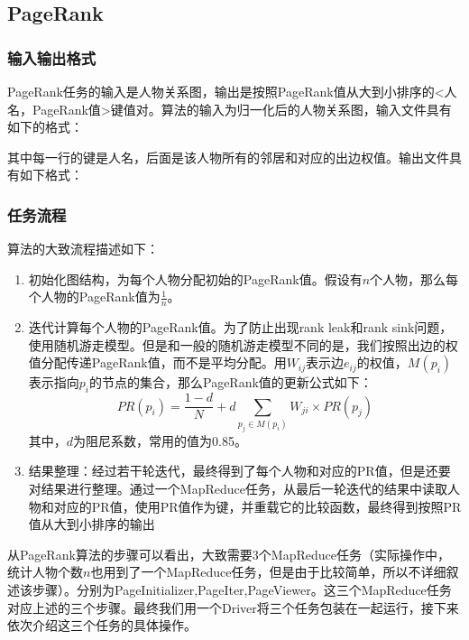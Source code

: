 \newpage

\subsection{PageRank}
\subsubsection{输入输出格式}
PageRank任务的输入是人物关系图，输出是按照PageRank值从大到小排序的<人名，PageRank值>键值对。算法的输入为归一化后的人物关系图，输入文件具有如下的格式：
\begin{center}
\end{center}
其中每一行的键是人名，后面是该人物所有的邻居和对应的出边权值。输出文件具有如下格式：
\begin{center}
\end{center}
\subsubsection{任务流程}
算法的大致流程描述如下：
\begin{enumerate}
	\item 初始化图结构，为每个人物分配初始的PageRank值。假设有$n$个人物，那么每个人物的PageRank值为$\frac{1}{n}$。
	\item 迭代计算每个人物的PageRank值。为了防止出现rank leak和rank sink问题，使用随机游走模型。但是和一般的随机游走模型不同的是，我们按照出边的权值分配传递PageRank值，而不是平均分配。用$W_{ij}$表示边$e_{ij}$的权值，$M(p_i)$表示指向$p_i$的节点的集合，那么PageRank值的更新公式如下：
	\[
		PR(p_i) = \frac{1-d}{N} + d \sum_{p_j \in M(p_i)} W_{ji} \times PR(p_j)
	\]
	其中，$d$为阻尼系数，常用的值为0.85。
	\item 结果整理：经过若干轮迭代，最终得到了每个人物和对应的PR值，但是还要对结果进行整理。通过一个MapReduce任务，从最后一轮迭代的结果中读取人物和对应的PR值，使用PR值作为键，并重载它的比较函数，最终得到按照PR值从大到小排序的输出
\end{enumerate}
从PageRank算法的步骤可以看出，大致需要3个MapReduce任务（实际操作中，统计人物个数$n$也用到了一个MapReduce任务，但是由于比较简单，所以不详细叙述该步骤）。分别为PageInitializer,PageIter,PageViewer。这三个MapReduce任务对应上述的三个步骤。最终我们用一个Driver将三个任务包装在一起运行，接下来依次介绍这三个任务的具体操作。


